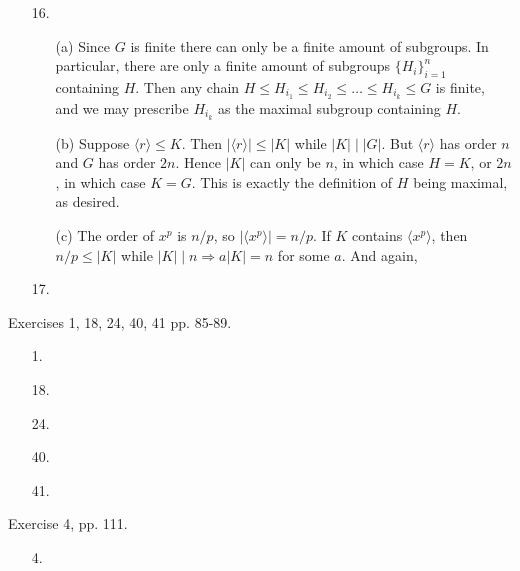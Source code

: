 \documentclass[12pt]{article}
\theoremstyle{remark}
\theoremstyle{named}
\renewcommand{\implies}{\Rightarrow}
\begin{document}
\begin{enumerate}
    \item [16.] 
    \begin{enumerate}
        \item[(a)] Since \(G\) is finite there can only be a finite amount of subgroups. In particular, there are only a finite amount of subgroups \(\{H_i\}_{i = 1}^n\) containing \(H\). Then any chain \(H \le H_{i_1} \le H_{i_2} \le \dots \le H_{i_k} \le G\) is finite, and we may prescribe \(H_{i_k}\) as the maximal subgroup containing \(H\).
        
        \item[(b)] Suppose \(\langle r \rangle \le K\). Then \(|\langle r \rangle| \le |K|\) while \(|K| \mid |G|\). But \(\langle r \rangle\) has order \(n\) and \(G\) has order \(2n\). Hence \(|K|\) can only be \(n\), in which case \(H = K\), or \(2n\), in which case \(K = G\). This is exactly the definition of \(H\) being maximal, as desired.
         
        \item[(c)] The order of \(x^p\) is \(n / p\), so \(|\langle x^p \rangle| = n / p\). If \(K\) contains \(\langle x^p \rangle\), then \(n/p \le |K|\) while \(|K| \mid n \implies a|K| = n\) for some \(a\). And again, 
    \end{enumerate}
    \item [17.]
\end{enumerate}

Exercises 1, 18, 24, 40, 41 pp. 85-89.

\begin{enumerate}
    \item [1.]
    \item [18.]
    \item [24.]
    \item [40.]
    \item [41.]
\end{enumerate}

Exercise 4, pp. 111.

\begin{enumerate}
    \item [4.]
\end{enumerate}
\end{document}
